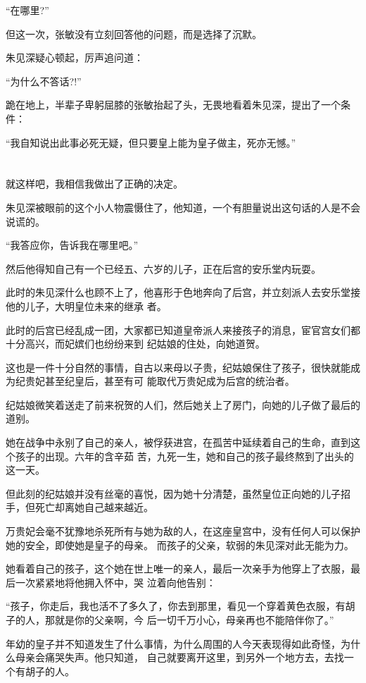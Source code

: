 \documentclass[11pt,a4paper,onecolumn]{article}
\begin{document}
``在哪里?''

但这一次，张敏没有立刻回答他的问题，而是选择了沉默。

朱见深疑心顿起，厉声追问道：

``为什么不答话?!''

跪在地上，半辈子卑躬屈膝的张敏抬起了头，无畏地看着朱见深，提出了一个条件：

``我自知说出此事必死无疑，但只要皇上能为皇子做主，死亦无憾。''

\section[\thesection]{}

就这样吧，我相信我做出了正确的决定。

朱见深被眼前的这个小人物震慑住了，他知道，一个有胆量说出这句话的人是不会说谎的。

``我答应你，告诉我在哪里吧。''

然后他得知自己有一个已经五、六岁的儿子，正在后宫的安乐堂内玩耍。

此时的朱见深什么也顾不上了，他喜形于色地奔向了后宫，并立刻派人去安乐堂接他的儿子，大明皇位未来的继承
者。

此时的后宫已经乱成一团，大家都已知道皇帝派人来接孩子的消息，宦官宫女们都十分高兴，而妃嫔们也纷纷来到
纪姑娘的住处，向她道贺。

这也是一件十分自然的事情，自古以来母以子贵，纪姑娘保住了孩子，很快就能成为纪贵妃甚至纪皇后，甚至有可
能取代万贵妃成为后宫的统治者。

纪姑娘微笑着送走了前来祝贺的人们，然后她关上了房门，向她的儿子做了最后的道别。

她在战争中永别了自己的亲人，被俘获进宫，在孤苦中延续着自己的生命，直到这个孩子的出现。六年的含辛茹
苦，九死一生，她和自己的孩子最终熬到了出头的这一天。

但此刻的纪姑娘并没有丝毫的喜悦，因为她十分清楚，虽然皇位正向她的儿子招手，但死亡却离她自己越来越近。

万贵妃会毫不犹豫地杀死所有与她为敌的人，在这座皇宫中，没有任何人可以保护她的安全，即使她是皇子的母亲。
而孩子的父亲，软弱的朱见深对此无能为力。

她看着自己的孩子，这个她在世上唯一的亲人，最后一次亲手为他穿上了衣服，最后一次紧紧地将他拥入怀中，哭
泣着向他告别：

``孩子，你走后，我也活不了多久了，你去到那里，看见一个穿着黄色衣服，有胡子的人，那就是你的父亲啊，今
后一切千万小心，母亲再也不能陪伴你了。''

年幼的皇子并不知道发生了什么事情，为什么周围的人今天表现得如此奇怪，为什么母亲会痛哭失声。他只知道，
自己就要离开这里，到另外一个地方去，去找一个有胡子的人。
\end{document}
